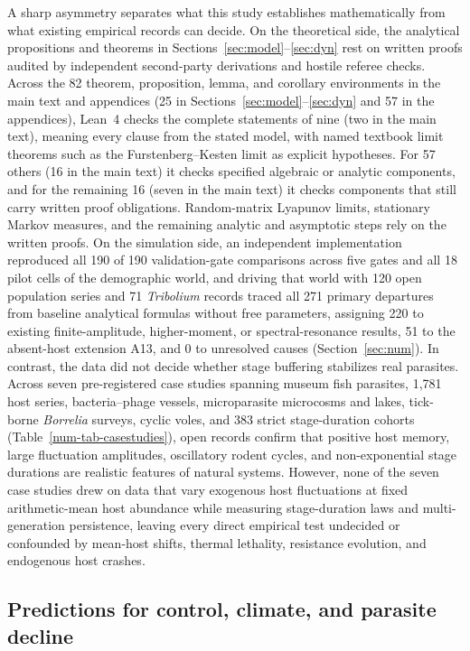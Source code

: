 A sharp asymmetry separates what this study establishes mathematically from what existing empirical records can decide. On the theoretical side, the analytical propositions and theorems in Sections~\ref{sec:model}--\ref{sec:dyn} rest on written proofs audited by independent second-party derivations and hostile referee checks. Across the 82 theorem, proposition, lemma, and corollary environments in the main text and appendices (25 in Sections~\ref{sec:model}--\ref{sec:dyn} and 57 in the appendices), Lean~4 checks the complete statements of nine (two in the main text), meaning every clause from the stated model, with named textbook limit theorems such as the Furstenberg--Kesten limit as explicit hypotheses. For 57 others (16 in the main text) it checks specified algebraic or analytic components, and for the remaining 16 (seven in the main text) it checks components that still carry written proof obligations. Random-matrix Lyapunov limits, stationary Markov measures, and the remaining analytic and asymptotic steps rely on the written proofs. On the simulation side, an independent implementation reproduced all 190 of 190 validation-gate comparisons across five gates and all 18 pilot cells of the demographic world, and driving that world with 120 open population series and 71 \textit{Tribolium} records traced all 271 primary departures from baseline analytical formulas without free parameters, assigning 220 to existing finite-amplitude, higher-moment, or spectral-resonance results, 51 to the absent-host extension A13, and 0 to unresolved causes (Section~\ref{sec:num}). In contrast, the data did not decide whether stage buffering stabilizes real parasites. Across seven pre-registered case studies spanning museum fish parasites, 1,781 host series, bacteria--phage vessels, microparasite microcosms and lakes, tick-borne \textit{Borrelia} surveys, cyclic voles, and 383 strict stage-duration cohorts (Table~\ref{num-tab-casestudies}), open records confirm that positive host memory, large fluctuation amplitudes, oscillatory rodent cycles, and non-exponential stage durations are realistic features of natural systems. However, none of the seven case studies drew on data that vary exogenous host fluctuations at fixed arithmetic-mean host abundance while measuring stage-duration laws and multi-generation persistence, leaving every direct empirical test undecided or confounded by mean-host shifts, thermal lethality, resistance evolution, and endogenous host crashes.

\subsection{Predictions for control, climate, and parasite decline}\label{subsec:disc-ecology}

